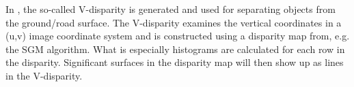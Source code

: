 In \cite{labayrade2003onboard}, the so-called V-disparity is generated and used for separating objects from the ground/road surface. The V-disparity examines the vertical coordinates in a (u,v) image coordinate system and is constructed using a disparity map from, e.g. the SGM algorithm. What is especially histograms are calculated for each row in the disparity. Significant surfaces in the disparity map will then show up as lines in the V-disparity. %

\vspace{2pt}